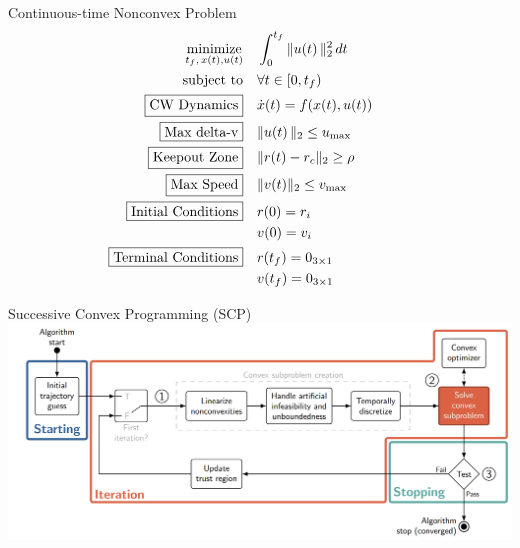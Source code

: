 \documentclass[aspectratio=169]{beamer}
\newcommand{\f}[2]{#1\!\left(#2\right)} %
\begin{document}
\begin{frame}{Continuous-time Nonconvex Problem}
    \begin{equation*}
            \begin{aligned}
            \underset{t_{f},\,{x}(t), {u}(t)}{\text{minimize}} &
            && \int_{0}^{t_f} \|\f{u}{t}\|_2^2 \,dt \\
            \text{subject to} &
            && \forall t \in [0, t_f) \\
            \fbox{\text{CW Dynamics}} &&& {\f{\dot{{x}}}{t}} = \f{f}{{\f{{x}}{t}}, {\f{{u}}{t}}} \\
            \fbox{\text{Max delta-v}} &&& \|\f{u}{t}\|_2 \le u_{\max}\\
            \fbox{\text{Keepout Zone}} &&& 
            \|{r}(t)-r_c\|_2 \geq \rho \hphantom{\qquad\qquad} \\
            \fbox{\text{Max Speed}}
            &&& \|{v}(t)\|_2 \leq v_{\mathrm{max}} \\
            \fbox{\text{Initial Conditions}}
            &&& {r}(0) = {r}_i \\
            &&& {v}(0) = {v}_i \\
            \fbox{\text{Terminal Conditions}}
            &&& {r}(t_f) = {0}_{3 \times 1} \\
            &&& {v}(t_f) = {0}_{3 \times 1} \\
            \end{aligned}
        \end{equation*}
\end{frame}
\begin{frame}{Successive Convex Programming (SCP)}
    \includegraphics[width=\linewidth]{img/scp_block_diagram_csm.png}
\end{frame}
\end{document}
